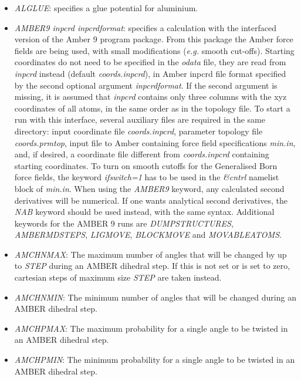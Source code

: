 \documentclass[12pt,a4paper,dvips]{article}
\begin{document}
\begin{itemize}
\item {\it ALGLUE\/}: specifies a glue potential for aluminium.

\item {\it AMBER9 inpcrd inpcrdformat\/}: specifies a calculation with the interfaced
version of the Amber 9 program package. From this package the Amber force fields
are being used, with small modifications ({\it e.g.} smooth cut-offs).
Starting coordinates do not need to be specified in the {\it odata} file, they
are read from {\it inpcrd} instead (default {\it coords.inpcrd}), in Amber inpcrd
file format specified by the second optional argument {\it inpcrdformat}.
If the second argument is missing, it is assumed that {\it inpcrd} contains
only three columns with the xyz coordinates of all atoms, in the same order
as in the topology file. To start a run with this interface,
several auxiliary files are required in the same directory: input coordinate file
{\it coords.inpcrd}, parameter topology file {\it coords.prmtop},
input file to Amber containing force field specifications {\it min.in}, and, if
desired, a coordinate file different from {\it coords.inpcrd} containing
starting coordinates.
To turn on smooth cutoffs for the Generalised Born force fields, the keyword
{\it ifswitch=1} has to be used in the {\it \&cntrl} namelist block of {\it min.in}.
When using the {\it AMBER9} keyword, any calculated second derivatives will be
numerical. If one wants analytical second derivatives, the {\it NAB} keyword
should be used instead, with the same syntax. 
Additional keywords for the AMBER 9 runs are {\it DUMPSTRUCTURES}, {\it AMBERMDSTEPS},
{\it LIGMOVE}, {\it BLOCKMOVE} and {\it MOVABLEATOMS}.

\item {\it AMCHNMAX\/}: The maximum number of angles that will be changed by up to {\it STEP\/} during an 
AMBER dihedral step. If this is not set or is set to zero, cartesian steps of maximum size {\it STEP\/} are taken 
instead. 

\item {\it AMCHNMIN\/}: The minimum number of angles that will be changed during an AMBER dihedral step.

\item {\it AMCHPMAX\/}: The maximum probability for a single angle to be twisted in an AMBER dihedral step.

\item {\it AMCHPMIN\/}: The minimum probability for a single angle to be twisted in an AMBER dihedral step.


\end{itemize}
\end{document}
